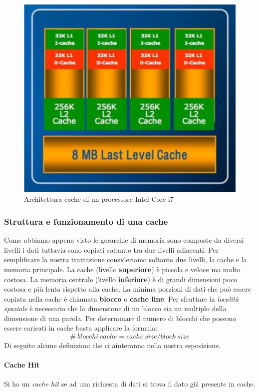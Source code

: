 \begin{figure}[htb]
\centering
\includegraphics[scale=0.5]{img/i7cache.png}
\caption{Architettura cache di un processore Intel Core i7}\label{fig:i7cache}
\end{figure}
\subsubsection{Struttura e funzionamento di una cache}
Come abbiamo appena visto le gerarchie di memoria sono composte da diversi livelli i dati tuttavia sono copiati soltanto tra due livelli adiacenti. Per semplificare la nostra trattazione consideriamo soltanto due livelli, la cache e la memoria principale. La cache (livello \textbf{superiore}) è piccola e veloce ma molto costosa. La memoria centrale (livello \textbf{inferiore}) è di grandi dimensioni poco costosa e più lenta rispetto alla cache. La minima porzioni di dati che può essere copiata nella cache è chiamata \textbf{blocco} o \textbf{cache line}.
Per sfruttare la \emph{località spaziale} è necessario che la dimensione di un blocco sia un multiplo della dimensione di una parola. Per determinare il numero di blocchi che possono essere caricati in cache basta applicare la formula:
$$\# \ blocchi \ cache = cache \ size / block \ size$$
Di seguito alcune definizioni che ci aiuteranno nella nostra esposizione.
\paragraph{Cache Hit}
Si ha un \emph{cache hit} se ad una richiesta di dati si trova il dato già presente in cache.
